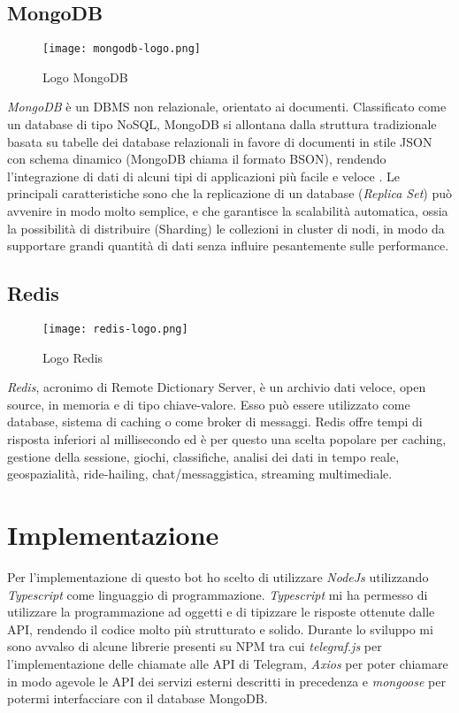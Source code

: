 \subsection{MongoDB}

\begin{wrapfigure}{r}{0.33\textwidth}
\centering
\texttt{[image: mongodb-logo.png]}
\caption{Logo MongoDB}
\end{wrapfigure}

\textit{MongoDB} è un DBMS non relazionale, orientato ai documenti. Classificato come un database di tipo NoSQL, MongoDB si allontana dalla struttura tradizionale basata su tabelle dei database relazionali in favore di documenti in stile JSON con schema dinamico (MongoDB chiama il formato BSON), rendendo l'integrazione di dati di alcuni tipi di applicazioni più facile e veloce \cite{Mongodb}. Le principali caratteristiche sono che la replicazione di un database (\textit{Replica Set}) può avvenire in modo molto semplice, e che garantisce la scalabilità automatica, ossia la possibilità di distribuire (Sharding) le collezioni in cluster di nodi, in modo da supportare grandi quantità di dati senza influire pesantemente sulle performance.

\subsection{Redis}

\begin{wrapfigure}{r}{0.33\textwidth}
\centering
\texttt{[image: redis-logo.png]}
\caption{Logo Redis}
\end{wrapfigure}

\textit{Redis}, acronimo di Remote Dictionary Server, è un archivio dati veloce, open source, in memoria e di tipo chiave-valore. Esso può essere utilizzato come database, sistema di caching o come broker di messaggi. Redis offre tempi di risposta inferiori al millisecondo ed è per questo una scelta popolare per caching, gestione della sessione, giochi, classifiche, analisi dei dati in tempo reale, geospazialità, ride-hailing, chat/messaggistica, streaming multimediale. \cite{Redis}

\pagebreak

\section{Implementazione}
\label{sec:implementazione}

Per l'implementazione di questo bot ho scelto di utilizzare \textit{NodeJs} utilizzando \textit{Typescript} come linguaggio di programmazione. \textit{Typescript} mi ha permesso di utilizzare la programmazione ad oggetti e di tipizzare le risposte ottenute dalle API, rendendo il codice molto più strutturato e solido.  Durante lo sviluppo mi sono avvalso di alcune librerie presenti su NPM tra cui \textit{telegraf.js} per l'implementazione delle chiamate alle API di Telegram, \textit{Axios} per poter chiamare in modo agevole le API dei servizi esterni descritti in precedenza e \textit{mongoose} per potermi interfacciare con il database MongoDB.

